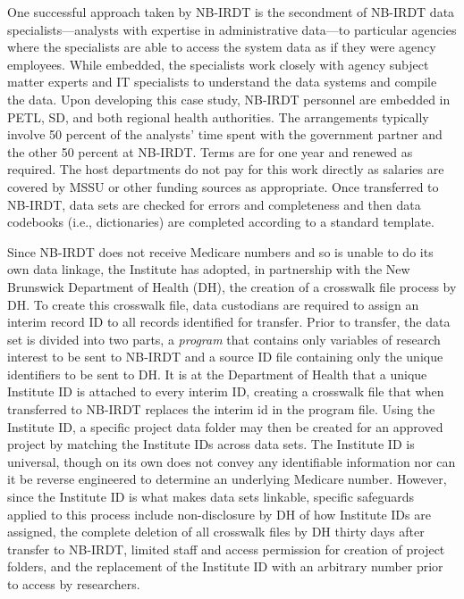 One successful approach taken by NB-IRDT is the secondment of NB-IRDT data specialists---analysts with expertise in administrative data---to particular agencies where the specialists are able to access the system data as if they were agency employees. While embedded, the specialists work closely with agency subject matter experts and IT specialists to understand the data systems and compile the data. Upon developing this case study, NB-IRDT personnel are embedded in PETL, SD, and both regional health authorities. The arrangements typically involve 50 percent of the analysts' time spent with the government partner and the other 50 percent at NB-IRDT. Terms are for one year and renewed as required. The host departments do not pay for this work directly as salaries are covered by MSSU or other funding sources as appropriate. Once transferred to NB-IRDT, data sets are checked for errors and completeness and then data codebooks (i.e., dictionaries) are completed according to a standard template.

Since NB-IRDT does not receive Medicare numbers and so is unable to do its own data linkage, the Institute has adopted, in partnership with the New Brunswick Department of Health (DH), the creation of a crosswalk file process by DH. To create this crosswalk file, data custodians are required to assign an interim record ID to all records identified for transfer. Prior to transfer, the data set is divided into two parts, a \emph{program} that contains only variables of research interest to be sent to NB-IRDT and a source ID file containing only the unique identifiers to be sent to DH. It is at the Department of Health that a unique Institute ID is attached to every interim ID, creating a crosswalk file that when transferred to NB-IRDT replaces the interim id in the program file. Using the Institute ID, a specific project data folder may then be created for an approved project by matching the Institute IDs across data sets. The Institute ID is universal, though on its own does not convey any identifiable information nor can it be reverse engineered to determine an underlying Medicare number. However, since the Institute ID is what makes data sets linkable, specific safeguards applied to this process include non-disclosure by DH of how Institute IDs are assigned, the complete deletion of all crosswalk files by DH thirty days after transfer to NB-IRDT, limited staff and access permission for creation of project folders, and the replacement of the Institute ID with an arbitrary number prior to access by researchers.

